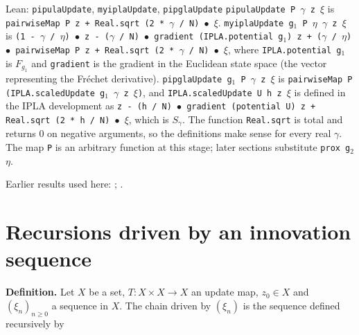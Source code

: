 \documentclass[11pt,a4paper]{article}
\begin{document}
\begin{leanbox}{Lean: \texttt{pipulaUpdate}, \texttt{myiplaUpdate}, \texttt{pipglaUpdate}}
\texttt{pipula\allowbreak{}Update P \ensuremath{\gamma} z \ensuremath{\xi}} is \texttt{pairwise\allowbreak{}Map P z + Real.\allowbreak{}sqrt (2 * \ensuremath{\gamma} /\allowbreak{} N) \ensuremath{\bullet} \ensuremath{\xi}}. \texttt{myipla\allowbreak{}Update g\ensuremath{{}_{1}} P \ensuremath{\eta} \ensuremath{\gamma} z \ensuremath{\xi}} is \texttt{(1 -\allowbreak{} \ensuremath{\gamma} /\allowbreak{} \ensuremath{\eta}) \ensuremath{\bullet} z -\allowbreak{} (\ensuremath{\gamma} /\allowbreak{} N) \ensuremath{\bullet} gradient (IPLA.\allowbreak{}potential g\ensuremath{{}_{1}}) z + (\ensuremath{\gamma} /\allowbreak{} \ensuremath{\eta}) \ensuremath{\bullet} pairwise\allowbreak{}Map P z + Real.\allowbreak{}sqrt (2 * \ensuremath{\gamma} /\allowbreak{} N) \ensuremath{\bullet} \ensuremath{\xi}}, where \texttt{IPLA.\allowbreak{}potential g\ensuremath{{}_{1}}} is \(F_{g_1}\) and \texttt{gradient} is the gradient in the Euclidean state space (the vector representing the Fréchet derivative). \texttt{pipgla\allowbreak{}Update g\ensuremath{{}_{1}} P \ensuremath{\gamma} z \ensuremath{\xi}} is \texttt{pairwise\allowbreak{}Map P (IPLA.\allowbreak{}scaled\allowbreak{}Update g\ensuremath{{}_{1}} \ensuremath{\gamma} z \ensuremath{\xi})}, and \texttt{IPLA.\allowbreak{}scaled\allowbreak{}Update U h z \ensuremath{\xi}} is defined in the IPLA development as \texttt{z -\allowbreak{} (h /\allowbreak{} N) \ensuremath{\bullet} gradient (potential U) z + Real.\allowbreak{}sqrt (2 * h /\allowbreak{} N) \ensuremath{\bullet} \ensuremath{\xi}}, which is \(S_\gamma\). The function \texttt{Real.\allowbreak{}sqrt} is total and returns \(0\) on negative arguments, so the definitions make sense for every real \(\gamma\). The map \texttt{P} is an arbitrary function at this stage; later sections substitute \texttt{prox g\ensuremath{{}_{2}} \ensuremath{\eta}}.
\end{leanbox}


Earlier results used here: \cite[Section~3.1.1]{LangevinLean2026IPLA}; \cite[Section~3.1.7]{LangevinLean2026IPLA}.

\section{\texorpdfstring{Recursions driven by an innovation sequence}{Recursions driven by an innovation sequence}}


\textbf{Definition.} Let \(X\) be a set, \(T:X\times X\to X\) an update map, \(z_0\in X\) and \((\xi_n)_{n\ge0}\) a sequence in \(X\). The chain driven by \((\xi_n)\) is the sequence defined recursively by
\end{document}
